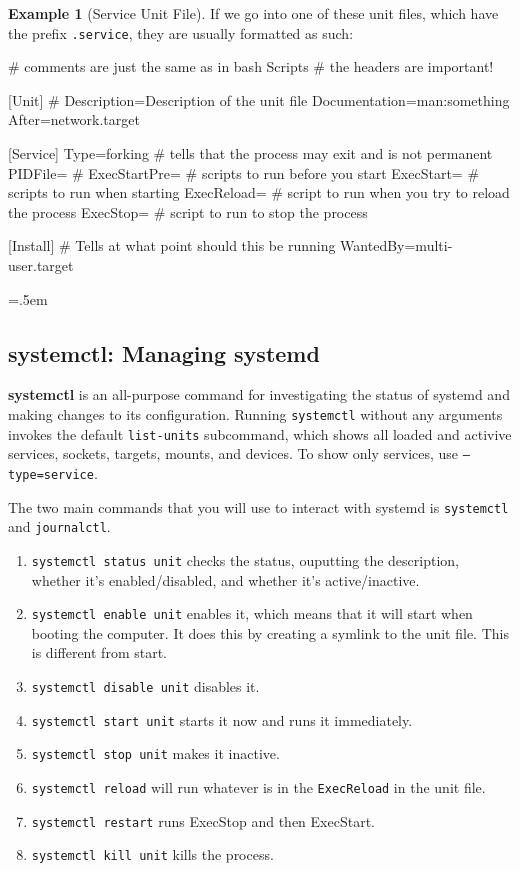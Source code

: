 \documentclass{article}
\theoremstyle{definition}
\newtheorem{example}{Example}[section]
\newenvironment{cverbatim}
    {\SaveVerbatim{cverb}}
    {\endSaveVerbatim
    \flushleft\fboxrule=0pt\fboxsep=.5em
    \colorbox{cverbbg}{%
      \makebox[\dimexpr\linewidth-2\fboxsep][l]{\BUseVerbatim{cverb}}%
    }
    \endflushleft
  }
\begin{document}
  \begin{example}[Service Unit File]
    If we go into one of these unit files, which have the prefix \texttt{.service}, they are usually formatted as such: 

    \begin{cverbatim}
      # comments are just the same as in bash Scripts
      # the headers are important! 

      [Unit]        #  
      Description=Description of the unit file 
      Documentation=man:something 
      After=network.target

      [Service]
      Type=forking  # tells that the process may exit and is not permanent
      PIDFile=      # 
      ExecStartPre= # scripts to run before you start 
      ExecStart=    # scripts to run when starting 
      ExecReload=   # script to run when you try to reload the process
      ExecStop=     # script to run to stop the process 

      [Install]   # Tells at what point should this be running
      WantedBy=multi-user.target 

    \end{cverbatim} 
  \end{example}
  
  \subsection{systemctl: Managing systemd} 

    \textbf{systemctl} is an all-purpose command for investigating the status of systemd and making changes to its configuration. Running \texttt{systemctl} without any arguments invokes the default \texttt{list-units} subcommand, which shows all loaded and activive services, sockets, targets, mounts, and devices. To show only services, use \texttt{--type=service}. 

    The two main commands that you will use to interact with systemd is \texttt{systemctl} and \texttt{journalctl}. 
    
    \begin{enumerate}
      \item \texttt{systemctl status unit} checks the status, ouputting the description, whether it's enabled/disabled, and whether it's active/inactive. 
      \item \texttt{systemctl enable unit} enables it, which means that it will start when booting the computer. It does this by creating a symlink to the unit file. This is different from start. 
      \item \texttt{systemctl disable unit} disables it. 
      \item \texttt{systemctl start unit} starts it now and runs it immediately. 
      \item \texttt{systemctl stop unit} makes it inactive. 
      \item \texttt{systemctl reload} will run whatever is in the \texttt{ExecReload} in the unit file. 
      \item \texttt{systemctl restart} runs ExecStop and then ExecStart. 
      \item \texttt{systemctl kill unit} kills the process. 
    \end{enumerate}
\end{document}
